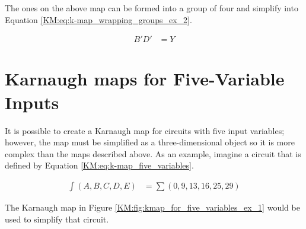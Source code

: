 The ones on the above map can be formed into a group of four and simplify into Equation \ref{KM:eq:k-map_wrapping_groups_ex_2}. 

\begin{align}
  \label{KM:eq:k-map_wrapping_groups_ex_2}
  B'D' &= Y
\end{align}

\section{Karnaugh maps for Five-Variable Inputs}
\label{KM:sec:karnaugh_maps_for_5-Variable_inputs}

It is possible to create a Karnaugh map for circuits with five input variables; however, the map must be simplified as a three-dimensional object so it is more complex than the maps described above. As an example, imagine a circuit that is defined by Equation \ref{KM:eq:k-map_five_variables}.

\begin{align}
  \label{KM:eq:k-map_five_variables}
  \int(A,B,C,D,E) &= \sum(0,9,13,16,25,29)
\end{align}

The Karnaugh map in Figure \ref{KM:fig:kmap_for_five_variables_ex_1} would be used to simplify that circuit.

